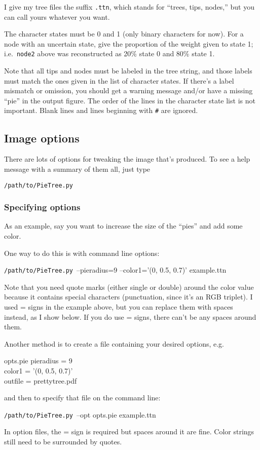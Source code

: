 \documentclass[10pt]{article}
\newcommand{\PTpath}{\texttt{/path/to/PieTree.py}\xspace}
\begin{document}
I give my tree files the suffix \texttt{.ttn}, which stands for ``trees, tips, nodes,'' but you can call yours whatever you want.

The character states must be 0 and 1 (only binary characters for now).
For a node with an uncertain state, give the proportion of the weight given to state 1; i.e.\ \texttt{node2} above was reconstructed as 20\% state 0 and 80\% state 1.

Note that all tips and nodes must be labeled in the tree string, and those labels must match the ones given in the list of character states.
If there's a label mismatch or omission, you should get a warning message and/or have a missing ``pie'' in the output figure.
The order of the lines in the character state list is not important.
Blank lines and lines beginning with \texttt{\#} are ignored.


\subsection*{Image options}

There are lots of options for tweaking the image that's produced.
To see a help message with a summary of them all, just type
\begin{commandis}
	\PTpath
\end{commandis}

\subsubsection*{Specifying options}

As an example, say you want to increase the size of the ``pies'' and add some color.

One way to do this is with command line options:
\begin{commandis}
	\PTpath \ --pieradius=9 --color1='(0, 0.5, 0.7)' example.ttn
\end{commandis}
Note that you need quote marks (either single or double) around the color value because it contains special characters (punctuation, since it's an RGB triplet).
I used = signs in the example above, but you can replace them with spaces instead, as I show below.  If you do use = signs, there can't be any spaces around them.

Another method is to create a file containing your desired options, e.g.\
\begin{filesays}{opts.pie}
	pieradius = 9				\\
	color1 = '(0, 0.5, 0.7)'		\\
	outfile = prettytree.pdf
\end{filesays}
and then to specify that file on the command line:
\begin{commandis}
	\PTpath \ --opt opts.pie example.ttn
\end{commandis}
In option files, the = sign is required but spaces around it are fine.  Color strings still need to be surrounded by quotes.
\end{document}
